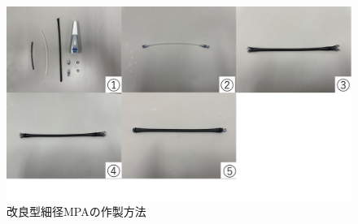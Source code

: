 \begin{figure}
  \centering
  \includegraphics[scale=0.4]{image/sakusei.jpg}
  \caption{改良型細径MPAの作製方法}
  \label{fig:shingata_sakuseihouhou}
\end{figure}
